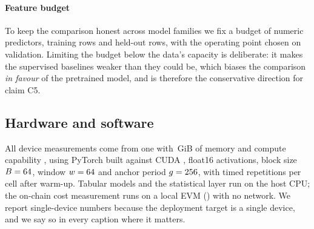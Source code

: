 \paragraph{Feature budget} To keep the comparison honest across model families
we fix a budget of \MainFeatures{} numeric predictors, \MainTrainRows{} training
rows and \MainTestRows{} held-out rows, with the operating point chosen on
validation. Limiting the budget below the data's capacity is deliberate: it
makes the supervised baselines weaker than they could be, which biases the
comparison \emph{in favour} of the pretrained model, and is therefore the
conservative direction for claim C5.

\subsection{Hardware and software}

All device measurements come from one \GpuName{} with \GpuMemGiB\,GiB of memory
and compute capability \GpuCapability, using PyTorch \TorchVer{} built against
CUDA \CudaVer, float16 activations, block size $B=64$, window
$w=64$ and anchor period $g=256$, with \GpuReps{} timed repetitions per
cell after warm-up. Tabular models and the statistical layer run on the host
CPU; the on-chain cost measurement runs on a local EVM (\SolcVer) with no
network. We report single-device numbers because the deployment target is a
single device, and we say so in every caption where it matters.
